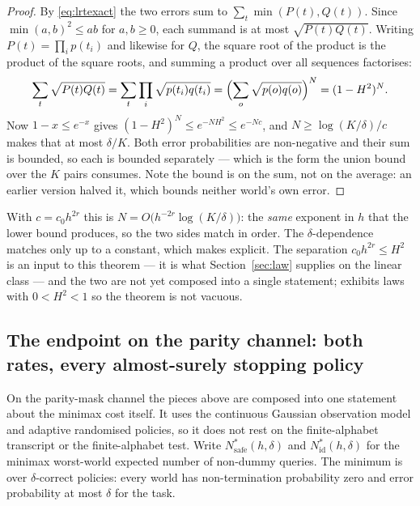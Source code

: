 \begin{proof}
By \eqref{eq:lrtexact} the two errors sum to $\sum_{t}\min(P(t),Q(t))$. Since
$\min(a,b)^{2}\le ab$ for $a,b\ge0$, each summand is at most $\sqrt{P(t)Q(t)}$. Writing
$P(t)=\prod_{i}p(t_{i})$ and likewise for $Q$, the square root of the product is the
product of the square roots, and summing a product over all sequences factorises:
\[
\sum_{t}\sqrt{P(t)Q(t)}
=\sum_{t}\prod_{i}\sqrt{p(t_{i})q(t_{i})}
=\Bigl(\sum_{o}\sqrt{p(o)q(o)}\Bigr)^{N}
=(1-H^{2})^{N}.
\]
Now $1-x\le e^{-x}$ gives $(1-H^{2})^{N}\le e^{-NH^{2}}\le e^{-Nc}$, and
$N\ge\log(K/\delta)/c$ makes that at most $\delta/K$. Both error probabilities are
non-negative and their sum is bounded, so each is bounded separately --- which is the form
the union bound over the $K$ pairs consumes. Note the bound is on the sum, not on the
average: an earlier version halved it, which bounds neither world's own error.
\end{proof}

With $c=c_{0}h^{2r}$ this is $N=O\bigl(h^{-2r}\log(K/\delta)\bigr)$: the \emph{same}
exponent in $h$ that the lower bound produces, so the two sides match in order. The
$\delta$-dependence matches only up to a constant, which  makes
explicit. The separation $c_{0}h^{2r}\le H^{2}$ is an input to this theorem --- it is what
Section~\ref{sec:law} supplies on the linear class --- and the two are not yet composed
into a single statement;  exhibits laws with $0<H^{2}<1$ so
the theorem is not vacuous.


\subsection{The endpoint on the parity channel: both rates, every almost-surely stopping policy}
\label{sec:endpoint}

On the parity-mask channel the pieces above are composed into one statement about the
minimax cost itself. It uses the continuous Gaussian observation model and adaptive
randomised policies, so it does not rest on the finite-alphabet transcript or the
finite-alphabet test. Write $N^{*}_{\mathrm{safe}}(h,\delta)$ and $N^{*}_{\mathrm{id}}(h,\delta)$
for the minimax worst-world expected number of non-dummy queries. The minimum is over
$\delta$-correct policies: every world has non-termination probability zero and error
probability at most $\delta$ for the task.

